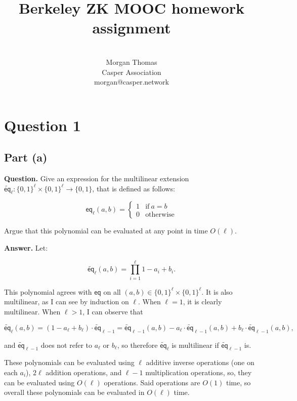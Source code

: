 \documentclass[11pt]{article}
\title{Berkeley ZK MOOC homework assignment}
\author{ \\ Morgan Thomas \\ Casper Association \\ morgan@casper.network }
\begin{document}
\maketitle

\section{Question 1}

\subsection{Part (a)}

\textbf{Question.} Give an expression for the multilinear extension
$\widetilde{\mathsf{eq}}_\ell : \{0,1\}^\ell \times \{0,1\}^\ell \to \{0,1\}$, that is defined
as follows:

\begin{equation}
  \mathsf{eq}_\ell(a, b) = \begin{cases}
	  1 & \text{if}\ a = b \\
	  0 & \text{otherwise}
  \end{cases}
\end{equation}

Argue that this polynomial can be evaluated at any point in time $O(\ell)$.

\textbf{Answer.} Let:

\begin{equation}
	\widetilde{\mathsf{eq}}_\ell(a,b) = \prod_{i=1}^\ell 1 - a_i + b_i.
\end{equation}

This polynomial agrees with $\mathsf{eq}$ on all
$(a,b) \in \{0,1\}^\ell \times \{0,1\}^\ell$. It is also multilinear,
as I can see by induction on $\ell$. When $\ell = 1$, it is clearly
multilinear. When $\ell > 1$, I can observe that

\begin{equation}
	\widetilde{\mathsf{eq}}_\ell(a,b) = (1 - a_\ell + b_\ell) \cdot \widetilde{\mathsf{eq}}_{\ell-1} = \widetilde{\mathsf{eq}}_{\ell-1}(a,b) - a_\ell \cdot \widetilde{\mathsf{eq}}_{\ell-1}(a,b) + b_\ell \cdot \widetilde{\mathsf{eq}}_{\ell-1}(a,b),
\end{equation}

and $\widetilde{\mathsf{eq}}_{\ell-1}$ does not refer to $a_\ell$ or $b_\ell$, so
therefore $\widetilde{\mathsf{eq}}_\ell$ is multilinear if $\widetilde{\mathsf{eq}}_{\ell-1}$ is.

These polynomials can be evaluated using $\ell$ additive inverse operations (one on each $a_i$), $2\ell$ addition operations, and $\ell-1$ multiplication operations, so, they can be evaluated using $O(\ell)$ operations. Said operations are $O(1)$ time, so overall these polynomials can be evaluated in $O(\ell)$ time.
\end{document}
